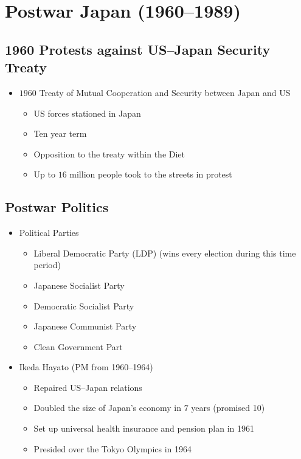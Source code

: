\documentclass[class=article, crop=false]{standalone}
\begin{document}
  \section{Postwar Japan (1960--1989)}
  \subsection{1960 Protests against US--Japan Security Treaty}
  \begin{itemize}
    \item $1960$ Treaty of Mutual Cooperation and Security between Japan and US
    \begin{itemize}
      \item US forces stationed in Japan
      \item Ten year term
      \item Opposition to the treaty within the Diet
      \item Up to $16$ million people took to the streets in protest
    \end{itemize}
  \end{itemize}
  \subsection{Postwar Politics}
  \begin{itemize}
    \item Political Parties
    \begin{itemize}
      \item Liberal Democratic Party (LDP) (wins every election during this time period)
      \item Japanese Socialist Party
      \item Democratic Socialist Party
      \item Japanese Communist Party
      \item Clean Government Part
    \end{itemize}
    \item Ikeda Hayato (PM from 1960--1964)
    \begin{itemize}
      \item Repaired US--Japan relations
      \item Doubled the size of Japan's economy in $7$ years (promised 10)
      \item Set up universal health insurance and pension plan in 1961
      \item Presided over the Tokyo Olympics in 1964
    \end{itemize}
  \end{itemize}
\end{document}
